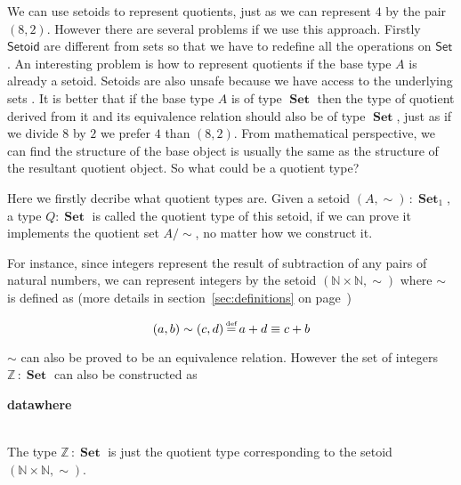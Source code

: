 \documentclass{article}
\newcommand{\Conid}[1]{\mathit{#1}}
\newcommand{\Varid}[1]{\mathit{#1}}
\def\resethooks{%
  \global\let\SaveRestoreHook\empty
  \global\let\ColumnHook\empty}
\newcommand{\hsindent}[1]{\quad}%
\let\hspre\empty
\let\hspost\empty
\renewcommand\Varid[1]{\mathord{\textsf{#1}}}
\let\Conid\Varid
\newcommand\Keyword[1]{\textsf{\textbf{#1}}}
\theoremstyle{definition}
\newcommand{\N}{\mathbb{N}}
\newcommand{\Z}{\mathbb{Z}}
\DeclareMathOperator{\Set}{\mathbf{Set}}
\DeclareMathOperator{\defi}{\stackrel{\text{\tiny def}}{=}}
\begin{document}
We can use setoids to represent quotients, just as we can represent
$4$ by the pair $(8,2)$. However there are several problems if we use
this approach. Firstly \ensuremath{\Conid{Setoid}} are
different from sets so that we have to redefine all the operations on
\ensuremath{\Conid{Set}}. An interesting problem is how to represent quotients if the base
type $A$ is already a setoid. Setoids are also unsafe because we have access to the underlying
 sets \cite{aan}. 
It is better that if the base type $A$ is of type $\Set$ then the type of
quotient derived from it and its equivalence relation should also be
of type $\Set$, just as if we divide $8$ by $2$ we prefer $4$ than
$(8,2)$. From mathematical perspective, we can find the structure of the base object is usually the same as the
structure of the resultant quotient object. So what could be a quotient type?

Here we firstly decribe what quotient types are. Given a setoid
$(A,\sim)\,\colon\Set_1$, a type $Q : \Set$ is called the quotient
type of this setoid, if we can prove it implements the quotient set
$A/\sim$, no matter how we construct it.

For instance, since integers represent the result of subtraction of
any pairs of natural numbers, we can represent integers by the setoid $(\N\times\N , \sim)$ where $\sim$ is
defined as (more details in section~\ref{sec:definitions} on page~\pageref{sec:definitions})

\[(a , b) \sim (c , d) \defi  a + d \equiv c + b \]

$\sim$ can also be proved to be an equivalence relation. However the
set of integers $\Z\,\colon\Set$ can also be constructed as 

\begin{hscode}\SaveRestoreHook
\column{B}{@{}>{\hspre}l<{\hspost}@{}}%
\column{3}{@{}>{\hspre}l<{\hspost}@{}}%
\column{E}{@{}>{\hspre}l<{\hspost}@{}}%
\>[B]{}\Keyword{data}\;\Conid{ℤ}\;\mathbin{:}\;\Conid{Set}\;\Keyword{where}{}\<[E]%
\\
\>[B]{}\hsindent{3}{}\<[3]%
\>[3]{}\Varid{+\char95 }\;\mathbin{:}\;\Conid{ℕ}\;\Varid{→}\;\Conid{ℤ}{}\<[E]%
\\
\>[B]{}\hsindent{3}{}\<[3]%
\>[3]{}\Varid{-suc\char95 }\;\mathbin{:}\;\Conid{ℕ}\;\Varid{→}\;\Conid{ℤ}{}\<[E]%
\ColumnHook
\end{hscode}\resethooks

The type $\Z\,\colon\Set$  is just the quotient type corresponding to
the setoid  $(\N\times\N , \sim)$. 
\end{document}
